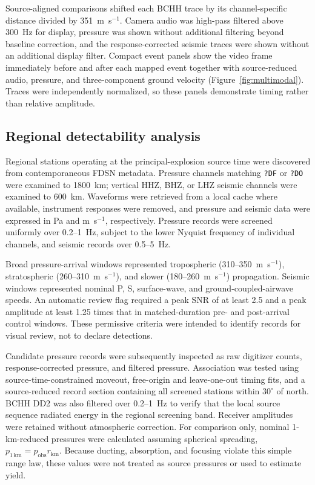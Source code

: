 \documentclass[]{seismica}
\begin{document}
Source-aligned comparisons shifted each BCHH trace by its channel-specific
distance divided by 351~m~s$^{-1}$. Camera audio was high-pass filtered above
300~Hz for display, pressure was shown without additional filtering beyond
baseline correction, and the response-corrected seismic traces were shown
without an additional display filter.
Compact event panels show the video frame immediately before and after each
mapped event together with source-reduced audio, pressure, and three-component
ground velocity (Figure~\ref{fig:multimodal}). Traces were independently
normalized, so these panels demonstrate timing rather than relative amplitude.

\subsection{Regional detectability analysis}
\label{sec:methods_regional}

Regional stations operating at the principal-explosion source time were
discovered from contemporaneous FDSN metadata. Pressure channels matching
\texttt{?DF} or \texttt{?DO} were examined to 1800~km; vertical HHZ, BHZ, or
LHZ seismic channels were examined to 600~km. Waveforms were retrieved from a
local cache where available, instrument responses were removed, and pressure
and seismic data were expressed in Pa and m~s$^{-1}$, respectively. Pressure
records were screened uniformly over 0.2--1~Hz, subject to the lower Nyquist
frequency of individual channels, and seismic records over 0.5--5~Hz.

Broad pressure-arrival windows represented tropospheric
(310--350~m~s$^{-1}$), stratospheric (260--310~m~s$^{-1}$), and slower
(180--260~m~s$^{-1}$) propagation. Seismic windows represented nominal P,
S, surface-wave, and ground-coupled-airwave speeds. An automatic review flag
required a peak SNR of at least 2.5 and a peak amplitude at least 1.25 times
that in matched-duration pre- and post-arrival control windows. These permissive
criteria were intended to identify records for visual review, not to declare
detections.

Candidate pressure records were subsequently inspected as raw digitizer
counts, response-corrected pressure, and filtered pressure. Association was
tested using source-time-constrained moveout, free-origin and leave-one-out
timing fits, and a source-reduced record section containing all screened
stations within $30^\circ$ of north. BCHH DD2 was also filtered over
0.2--1~Hz to verify that the local source sequence radiated energy in the
regional screening band. Receiver amplitudes were retained without atmospheric
correction. For comparison only, nominal 1-km-reduced pressures were calculated
assuming spherical spreading, $p_{1\,\mathrm{km}}=p_{\mathrm{obs}}r_{\mathrm{km}}$.
Because ducting, absorption, and focusing violate this simple range law, these
values were not treated as source pressures or used to estimate yield.
\end{document}
